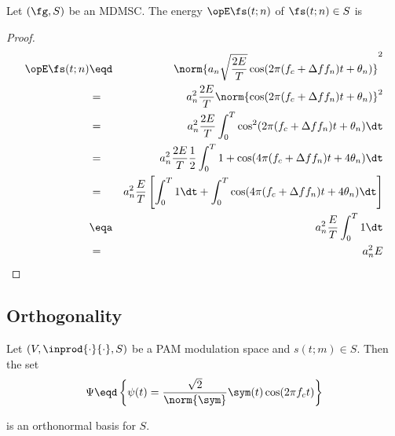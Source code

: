 \begin{theorem}
Let $(\fg,S)$ be an MDMSC.
The energy $\opE \fs(t;n)$ of $\fs(t;n)\in S$ is
\end{theorem}
\begin{proof}
\begin{eqnarray*}
  \opE \fs(t;n)
    &\eqd& \norm{a_n \sqrt{\frac{2E}{T}} \cos(2\pi(f_c+\Delta f f_n)t+\theta_n)}^2
  \\&=& a_n^2 \frac{2E}{T}
        \norm{ \cos(2\pi(f_c+\Delta f f_n)t+\theta_n)}^2
  \\&=& a_n^2 \frac{2E}{T}
        \int_0^T \cos^2(2\pi(f_c+\Delta f f_n)t+\theta_n) \dt
  \\&=& a_n^2 \frac{2E}{T}\frac{1}{2}
        \int_0^T 1 + \cos(4\pi(f_c+\Delta f f_n)t+4\theta_n) \dt
  \\&=& a_n^2 \frac{E}{T}\left[
        \int_0^T 1  \dt +
        \int_0^T \cos(4\pi(f_c+\Delta f f_n)t+4\theta_n) \dt
        \right]
  \\&\eqa& a_n^2 \frac{E}{T}  \int_0^T 1  \dt
  \\&=&    a_n^2 E
\end{eqnarray*}
\end{proof}

\subsection{Orthogonality}

\begin{proposition}
\label{lem:pam_basis}
Let $(V, \inprod{\cdot}{\cdot}, S)$ be a PAM modulation space and 
$s(t;m)\in S$.
Then the set
\[
   \Psi \eqd \left\{ 
      \psi(t) = \frac{\sqrt{2}}{\norm{\sym}} \sym(t) \cos(2\pi f_c t)
      \right\}
\]

is an orthonormal basis for $S$.
\end{proposition}

